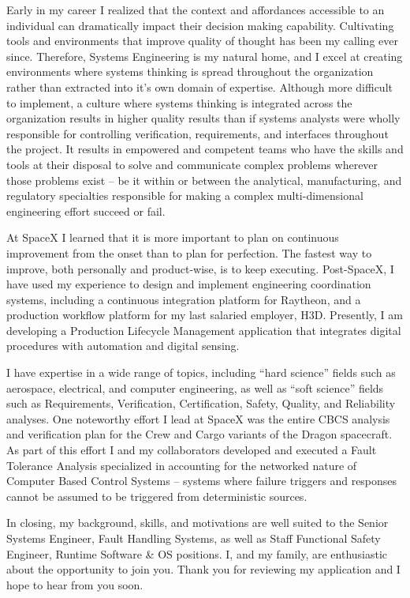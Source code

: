 \begin{cvletter}



Early in my career I realized that the context and affordances accessible to an individual can
dramatically impact their decision making capability. Cultivating tools and environments that
improve quality of thought has been my calling ever since. Therefore, Systems Engineering is my
natural home, and I excel at creating environments where systems thinking is spread throughout the
organization rather than extracted into it's own domain of expertise. Although more difficult to
implement, a culture where systems thinking is integrated across the organization results in higher
quality results than if systems analysts were wholly responsible for controlling verification,
requirements, and interfaces throughout the project. It results in empowered and competent teams who
have the skills and tools at their disposal to solve and communicate complex problems wherever those
problems exist -- be it within or between the analytical, manufacturing, and regulatory specialties
responsible for making a complex multi-dimensional engineering effort succeed or fail.

At SpaceX I learned that it is more important to plan on continuous improvement from the onset than
to plan for perfection. The fastest way to improve, both personally and product-wise, is to keep
executing. Post-SpaceX, I have used my experience to design and implement engineering coordination
systems, including a continuous integration platform for Raytheon, and a production workflow
platform for my last salaried employer, H3D. Presently, I am developing a Production Lifecycle
Management application that integrates digital procedures with automation and digital sensing.

I have expertise in a wide range of topics, including ``hard science'' fields such as aerospace,
electrical, and computer engineering, as well as ``soft science'' fields such as Requirements,
Verification, Certification, Safety, Quality, and Reliability analyses. One noteworthy effort I lead
at SpaceX was the entire CBCS analysis and verification plan for the Crew and Cargo variants of the
Dragon spacecraft. As part of this effort I and my collaborators developed and executed a Fault
Tolerance Analysis specialized in accounting for the networked nature of Computer Based Control
Systems -- systems where failure triggers and responses cannot be assumed to be triggered from
deterministic sources.

In closing, my background, skills, and motivations are well suited to the Senior Systems Engineer,
Fault Handling Systems, as well as Staff Functional Safety Engineer, Runtime Software \& OS
positions. I, and my family, are enthusiastic about the opportunity to join you. Thank you for
reviewing my application and I hope to hear from you soon.


\end{cvletter}

